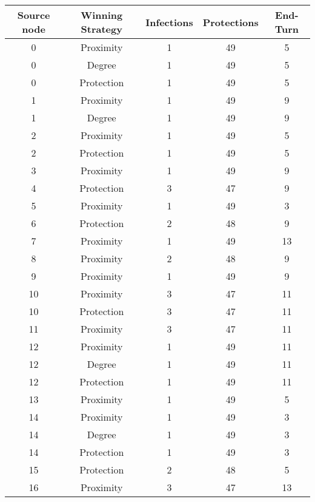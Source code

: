 \documentclass[results.tex]{subfiles}
\begin{document}
\begin{center}
  \begin{tabular}{| c || c | c | c | c |}
    \hline
    {\bfseries Source node} & {\bfseries Winning Strategy} & {\bfseries Infections} & {\bfseries Protections} & {\bfseries End-Turn} \\  %
    \hline\hline
    0 & Proximity & 1 & 49 & 5 \\ 
    \hline
    0 & Degree & 1 & 49 & 5 \\ 
    \hline
    0 & Protection & 1 & 49 & 5 \\ 
    \hline
    1 & Proximity & 1 & 49 & 9 \\ 
    \hline
    1 & Degree & 1 & 49 & 9 \\ 
    \hline
    2 & Proximity & 1 & 49 & 5 \\ 
    \hline
    2 & Protection & 1 & 49 & 5 \\ 
    \hline
    3 & Proximity & 1 & 49 & 9 \\ 
    \hline
    4 & Protection & 3 & 47 & 9 \\ 
    \hline
    5 & Proximity & 1 & 49 & 3 \\ 
    \hline
    6 & Protection & 2 & 48 & 9 \\ 
    \hline
    7 & Proximity & 1 & 49 & 13 \\ 
    \hline
    8 & Proximity & 2 & 48 & 9 \\ 
    \hline
    9 & Proximity & 1 & 49 & 9 \\ 
    \hline
    10 & Proximity & 3 & 47 & 11 \\ 
    \hline
    10 & Protection & 3 & 47 & 11 \\ 
    \hline
    11 & Proximity & 3 & 47 & 11 \\ 
    \hline
    12 & Proximity & 1 & 49 & 11 \\ 
    \hline
    12 & Degree & 1 & 49 & 11 \\ 
    \hline
    12 & Protection & 1 & 49 & 11 \\ 
    \hline
    13 & Proximity & 1 & 49 & 5 \\ 
    \hline
    14 & Proximity & 1 & 49 & 3 \\ 
    \hline
    14 & Degree & 1 & 49 & 3 \\ 
    \hline
    14 & Protection & 1 & 49 & 3 \\ 
    \hline
    15 & Protection & 2 & 48 & 5 \\ 
    \hline
    16 & Proximity & 3 & 47 & 13 \\ 
    \hline

\end{tabular}
\end{center}
\end{document}
